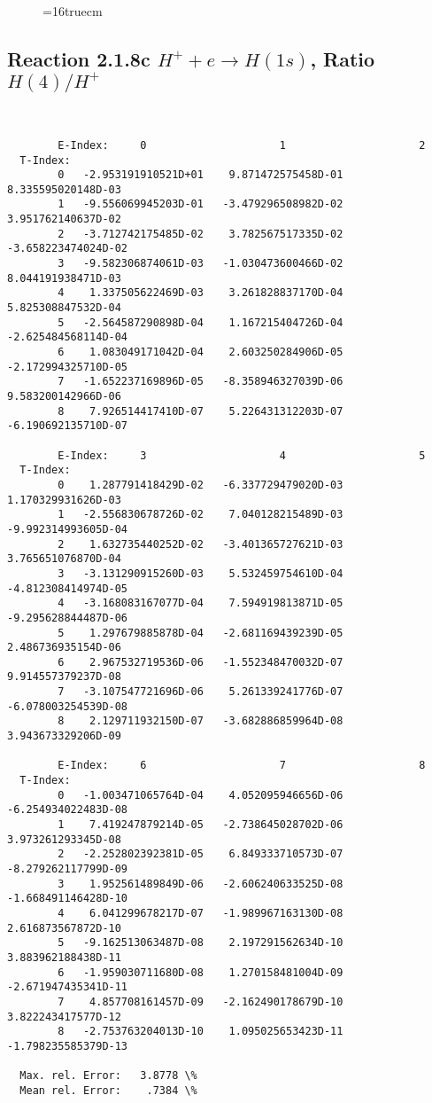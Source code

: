 \documentclass[12pt,dvipdfmx]{article}
\begin{document}
\begin{figure} \label{2.1.8rb}
\epsfxsize=16truecm
\end{figure}
\newpage



\subsection{
Reaction 2.1.8c  $H^+ + e \rightarrow H(1s) $,  Ratio $H(4)/H^+$
}

\begin{small}\begin{verbatim}


        E-Index:     0                     1                     2
  T-Index:
        0   -2.953191910521D+01    9.871472575458D-01    8.335595020148D-03
        1   -9.556069945203D-01   -3.479296508982D-02    3.951762140637D-02
        2   -3.712742175485D-02    3.782567517335D-02   -3.658223474024D-02
        3   -9.582306874061D-03   -1.030473600466D-02    8.044191938471D-03
        4    1.337505622469D-03    3.261828837170D-04    5.825308847532D-04
        5   -2.564587290898D-04    1.167215404726D-04   -2.625484568114D-04
        6    1.083049171042D-04    2.603250284906D-05   -2.172994325710D-05
        7   -1.652237169896D-05   -8.358946327039D-06    9.583200142966D-06
        8    7.926514417410D-07    5.226431312203D-07   -6.190692135710D-07

        E-Index:     3                     4                     5
  T-Index:
        0    1.287791418429D-02   -6.337729479020D-03    1.170329931626D-03
        1   -2.556830678726D-02    7.040128215489D-03   -9.992314993605D-04
        2    1.632735440252D-02   -3.401365727621D-03    3.765651076870D-04
        3   -3.131290915260D-03    5.532459754610D-04   -4.812308414974D-05
        4   -3.168083167077D-04    7.594919813871D-05   -9.295628844487D-06
        5    1.297679885878D-04   -2.681169439239D-05    2.486736935154D-06
        6    2.967532719536D-06   -1.552348470032D-07    9.914557379237D-08
        7   -3.107547721696D-06    5.261339241776D-07   -6.078003254539D-08
        8    2.129711932150D-07   -3.682886859964D-08    3.943673329206D-09

        E-Index:     6                     7                     8
  T-Index:
        0   -1.003471065764D-04    4.052095946656D-06   -6.254934022483D-08
        1    7.419247879214D-05   -2.738645028702D-06    3.973261293345D-08
        2   -2.252802392381D-05    6.849333710573D-07   -8.279262117799D-09
        3    1.952561489849D-06   -2.606240633525D-08   -1.668491146428D-10
        4    6.041299678217D-07   -1.989967163130D-08    2.616873567872D-10
        5   -9.162513063487D-08    2.197291562634D-10    3.883962188438D-11
        6   -1.959030711680D-08    1.270158481004D-09   -2.671947435341D-11
        7    4.857708161457D-09   -2.162490178679D-10    3.822243417577D-12
        8   -2.753763204013D-10    1.095025653423D-11   -1.798235585379D-13

  Max. rel. Error:   3.8778 \%
  Mean rel. Error:    .7384 \%


\end{verbatim}\end{small}
\end{document}
